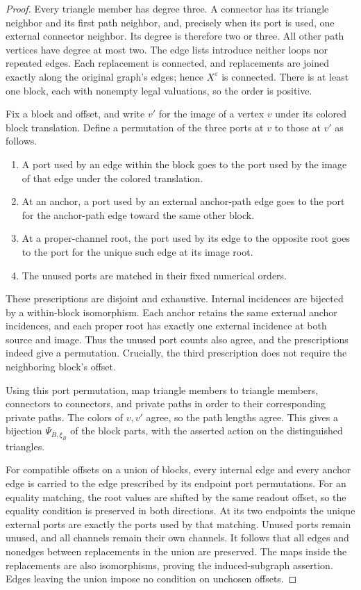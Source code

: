 \documentclass[11pt]{article}
\theoremstyle{definition}
\begin{document}
\begin{proof}
Every triangle member has degree three.
A connector has its triangle neighbor and its first path neighbor,
and, precisely when its port is used, one external connector neighbor.
Its degree is therefore two or three.
All other path vertices have degree at most two.
The edge lists introduce neither loops nor repeated edges.
Each replacement is connected, and replacements are joined exactly
along the original graph's edges; hence \(X^\varepsilon\) is connected.
There is at least one block, each with nonempty legal valuations,
so the order is positive.

Fix a block and offset, and write \(v'\) for the image of a vertex
\(v\) under its colored block translation.
Define a permutation of the three ports at \(v\) to those at \(v'\)
as follows.
\begin{enumerate}
\item
A port used by an edge within the block goes to the port used by the
image of that edge under the colored translation.
\item
At an anchor, a port used by an external anchor-path edge goes to the
port for the anchor-path edge toward the same other block.
\item
At a proper-channel root, the port used by its edge to the opposite
root goes to the port for the unique such edge at its image root.
\item
The unused ports are matched in their fixed numerical orders.
\end{enumerate}
These prescriptions are disjoint and exhaustive.
Internal incidences are bijected by a within-block isomorphism.
Each anchor retains the same external anchor incidences, and each
proper root has exactly one external incidence at both source and
image.  Thus the unused port counts also agree, and the prescriptions
indeed give a permutation.
Crucially, the third prescription does not require the neighboring
block's offset.

Using this port permutation, map triangle members to triangle members,
connectors to connectors, and private paths in order to their
corresponding private paths.  The colors of \(v,v'\) agree, so the
path lengths agree.  This gives a bijection
\(\Psi_{B,\xi_B}\) of the block parts, with the asserted action on the
distinguished triangles.

For compatible offsets on a union of blocks, every internal edge and
every anchor edge is carried to the edge prescribed by its endpoint
port permutations.
For an equality matching, the root values are shifted by the same
readout offset, so the equality condition is preserved in both
directions.  At its two endpoints the unique external ports are
exactly the ports used by that matching.
Unused ports remain unused, and all channels remain their own channels.
It follows that all edges and nonedges between replacements in the
union are preserved.  The maps inside the replacements are also
isomorphisms, proving the induced-subgraph assertion.
Edges leaving the union impose no condition on unchosen offsets.


\end{proof}
\end{document}
